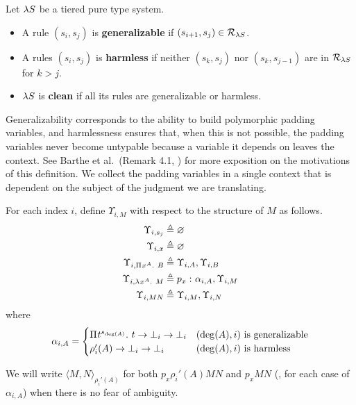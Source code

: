 \documentclass{article}
\begin{document}
\begin{definition}
Let $\lambda S$ be a tiered pure type system.
\begin{itemize}
    \item A rule $(s_i, s_j)$ is \textbf{generalizable} if $(s_{i + 1}, s_j) \in \mathcal R_{\lambda S}$.
    \item A rules $(s_i, s_j)$ is \textbf{harmless} if neither $(s_k, s_j)$ nor $(s_k, s_{j - 1})$ are in $\mathcal R_{\lambda S}$ for $k > j$.
    \item $\lambda S$ is \textbf{clean} if all its rules are generalizable or harmless.
\end{itemize}
\end{definition}

Generalizability corresponds to the ability to build polymorphic padding variables, and harmlessness ensures that, when this is not possible, the padding variables never become untypable because a variable it depends on leaves the context.
See Barthe et al.\ (Remark 4.1, \cite{barthe-et-al-2001}) for more exposition on the motivations of this definition.
We collect the padding variables in a single context that is dependent on the subject of the judgment we are translating.

\begin{definition}
For each index $i$, define $\Upsilon_{i, M}$ with respect to the structure of $M$ as follows.
\begin{align*}
    \Upsilon_{i, s_j} &\triangleq \varnothing \\
    \Upsilon_{i, x} &\triangleq \varnothing \\
    \Upsilon_{i, {\Pi^{} {x}^{A}. \ {B}}} &\triangleq \Upsilon_{i, A}, \Upsilon_{i, B} \\
    \Upsilon_{i, \lambda^{} x^{A}. \ M} &\triangleq {{p_x} :^{} {\alpha_{i, A}}}, \Upsilon_{i, M} \\
    \Upsilon_{i, MN} &\triangleq \Upsilon_{i, M}, \Upsilon_{i, N}
\end{align*}
where
\[
\alpha_{i, A} =
\begin{cases}
    {\Pi^{} {t}^{s_{\deg(A)}}. \ {t \to \bot_i \to \bot_i}} & \textnormal{$(\deg(A), i)$ is generalizable} \\
    \rho_i'(A) \to \bot_i \to \bot_i & \textnormal{$(\deg(A), i)$ is harmless}
\end{cases}
\]
\end{definition}

\newcommand{\pair}[3][]{\langle#2, #3\rangle_{#1}}
We will write $\pair[\rho_i'(A)] M N$ for both $p_x \rho_i'(A) M N$ and $p_x M N$ (\ie, for each case of $\alpha_{i , A}$) when there is no fear of ambiguity.
\end{document}

